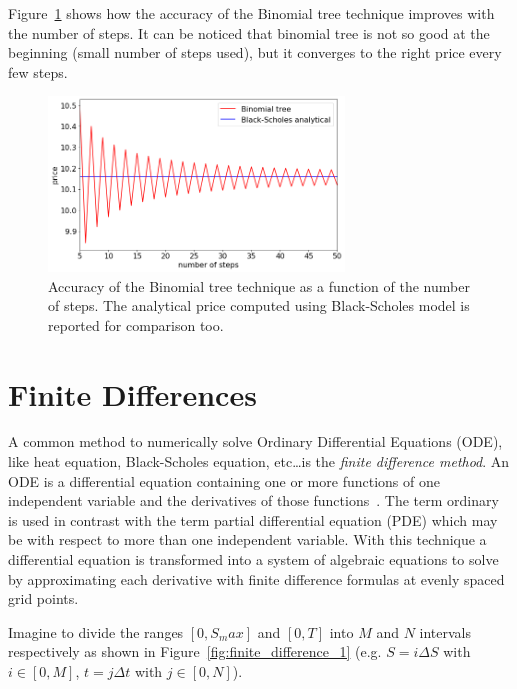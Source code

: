 Figure~\ref{fig:binomial_tree_accuracy} shows how the accuracy of the Binomial tree technique improves with the number of steps.
It can be noticed that binomial tree is not so good at the beginning (small number of steps used), but it converges to the right price every few steps. 

\begin{figure}[htb]
	\centering
	\includegraphics[width=0.7\textwidth]{figures/binomial_tree_accuracy}
	\caption{Accuracy of the Binomial tree technique as a function of the number of steps. The analytical price computed using Black-Scholes model is reported for comparison too.}
	\label{fig:binomial_tree_accuracy}
\end{figure} 

\section{Finite Differences} 
\label{sec:finite_difference}
A common method to numerically solve Ordinary Differential Equations (ODE), like heat equation, Black-Scholes equation, etc\ldots is the \emph{finite difference method}. An ODE is a differential equation containing one or more functions of one independent variable and the derivatives of those functions~\cite{bib:ode}. The term ordinary is used in contrast with the term partial differential equation (PDE) which may be with respect to more than one independent variable.
With this technique a differential equation is transformed into a system of algebraic equations to solve by approximating each derivative with finite difference formulas at evenly spaced grid points.

Imagine to divide the ranges $[0, S_max]$ and $[0, T]$ into $M$ and $N$ intervals respectively as shown in Figure~\ref{fig:finite_difference_1} (e.g. $S = i\Delta S$ with $i\in[0, M]$, $t = j\Delta t$ with $j \in[0,N]$).

